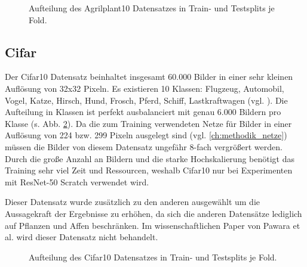 \begin{figure}[H]
\begin{adjustbox}{width=1.1\textwidth, center}

\end{adjustbox}
\caption{Aufteilung des Agrilplant10 Datensatzes \cite{pawaraWebsiteDatensaetze} in Train- und Testsplits je Fold.}
\label{fig:Agrilplant10Zusammensetzung}
\end{figure}


\subsection{Cifar}
\label{ch:methodik_datensaetzeCifar10}
Der Cifar10 Datensatz beinhaltet insgesamt 60.000 Bilder in einer sehr kleinen Auflösung von 32x32 Pixeln. Es existieren 10 Klassen: Flugzeug, Automobil, Vogel, Katze, Hirsch, Hund, Frosch, Pferd, Schiff, Lastkraftwagen (vgl. \cite{cifar10}).
Die Aufteilung in Klassen ist perfekt ausbalanciert mit genau 6.000 Bildern pro Klasse (s. Abb. \ref{fig:Cifar10Zusammensetzung}).
Da die zum Training verwendeten Netze für Bilder in einer Auflösung von 224 bzw. 299 Pixeln ausgelegt sind (vgl. \ref{ch:methodik_netze}) müssen die Bilder von diesem Datensatz ungefähr 8-fach vergrößert werden.\\

Durch die große Anzahl an Bildern und die starke Hochskalierung benötigt das Training sehr viel Zeit und Ressourcen, weshalb Cifar10 nur bei Experimenten mit ResNet-50 Scratch verwendet wird.

Dieser Datensatz wurde zusätzlich zu den anderen ausgewählt um die Aussagekraft der Ergebnisse zu erhöhen, da sich die anderen Datensätze lediglich auf Pflanzen und Affen beschränken. Im wissenschaftlichen Paper von Pawara et al. \cite{pawaraPaper} wird dieser Datensatz nicht behandelt.

\begin{figure}[H]
\begin{adjustbox}{width=1.4\textwidth, center}

\end{adjustbox}
\caption{Aufteilung des Cifar10 Datensatzes \cite{cifar10} in Train- und Testsplits je Fold.}
\label{fig:Cifar10Zusammensetzung}
\end{figure}


